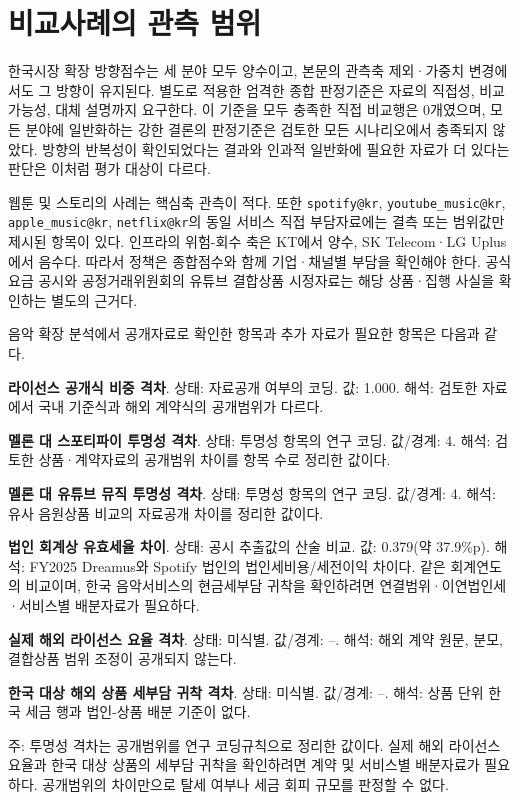 \section{비교사례의 관측 범위}
한국시장 확장 방향점수는 세 분야 모두 양수이고, 본문의 관측축 제외·가중치 변경에서도 그 방향이 유지된다. 별도로 적용한 엄격한 종합 판정기준은 자료의 직접성, 비교 가능성, 대체 설명까지 요구한다. 이 기준을 모두 충족한 직접 비교행은 0개였으며, 모든 분야에 일반화하는 강한 결론의 판정기준은 검토한 모든 시나리오에서 충족되지 않았다. 방향의 반복성이 확인되었다는 결과와 인과적 일반화에 필요한 자료가 더 있다는 판단은 이처럼 평가 대상이 다르다.

웹툰 및 스토리의 사례는 핵심축 관측이 적다. 또한 \nolinkurl{spotify@kr}, \nolinkurl{youtube_music@kr}, \nolinkurl{apple_music@kr}, \nolinkurl{netflix@kr}의 동일 서비스 직접 부담자료에는 결측 또는 범위값만 제시된 항목이 있다. 인프라의 위험-회수 축은 KT에서 양수, SK Telecom·LG Uplus에서 음수다. 따라서 정책은 종합점수와 함께 기업·채널별 부담을 확인해야 한다. 공식 요금 공시와 공정거래위원회의 유튜브 결합상품 시정자료는 해당 상품·집행 사실을 확인하는 별도의 근거다.

음악 확장 분석에서 공개자료로 확인한 항목과 추가 자료가 필요한 항목은 다음과 같다.

\begingroup
\footnotesize
\begin{summarylist}
  \item \textbf{라이선스 공개식 비중 격차}. 상태: 자료공개 여부의 코딩. 값: 1.000. 해석: 검토한 자료에서 국내 기준식과 해외 계약식의 공개범위가 다르다.
  \item \textbf{멜론 대 스포티파이 투명성 격차}. 상태: 투명성 항목의 연구 코딩. 값/경계: 4. 해석: 검토한 상품·계약자료의 공개범위 차이를 항목 수로 정리한 값이다.
  \item \textbf{멜론 대 유튜브 뮤직 투명성 격차}. 상태: 투명성 항목의 연구 코딩. 값/경계: 4. 해석: 유사 음원상품 비교의 자료공개 차이를 정리한 값이다.
  \item \textbf{법인 회계상 유효세율 차이}. 상태: 공시 추출값의 산술 비교. 값: 0.379(약 37.9\%p). 해석: FY2025 Dreamus와 Spotify 법인의 법인세비용/세전이익 차이다. 같은 회계연도의 비교이며, 한국 음악서비스의 현금세부담 귀착을 확인하려면 연결범위·이연법인세·서비스별 배분자료가 필요하다.
  \item \textbf{실제 해외 라이선스 요율 격차}. 상태: 미식별. 값/경계: --. 해석: 해외 계약 원문, 분모, 결합상품 범위 조정이 공개되지 않는다.
  \item \textbf{한국 대상 해외 상품 세부담 귀착 격차}. 상태: 미식별. 값/경계: --. 해석: 상품 단위 한국 세금 행과 법인-상품 배분 기준이 없다.
\end{summarylist}
{\par\raggedright\footnotesize 주: 투명성 격차는 공개범위를 연구 코딩규칙으로 정리한 값이다. 실제 해외 라이선스 요율과 한국 대상 상품의 세부담 귀착을 확인하려면 계약 및 서비스별 배분자료가 필요하다. 공개범위의 차이만으로 탈세 여부나 세금 회피 규모를 판정할 수 없다.\par}
\endgroup

